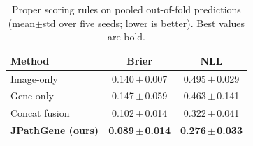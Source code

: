 \begin{table}[t]
\centering
\caption{Proper scoring rules on pooled out-of-fold predictions
(mean$\pm$std over five seeds; lower is better). Best values are bold.}
\label{tab:calibration}
\begin{tabular}{lcc}
\toprule
Method & Brier & NLL \\
\midrule
Image-only & 0.140\,$\pm$\,0.007 & 0.495\,$\pm$\,0.029 \\
Gene-only & 0.147\,$\pm$\,0.059 & 0.463\,$\pm$\,0.141 \\
Concat fusion & 0.102\,$\pm$\,0.014 & 0.322\,$\pm$\,0.041 \\
\textbf{JPathGene (ours)} & \textbf{0.089\,$\pm$\,0.014} & \textbf{0.276\,$\pm$\,0.033} \\
\bottomrule
\end{tabular}
\end{table}

